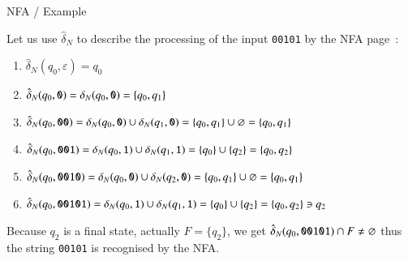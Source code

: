 \documentclass[compress,dvips,xcolor={dvipsnames},t]{beamer}
\begin{document}
%
\begin{frame}[fragile]{NFA / Example}

\label{nfa_01_suffix_formal}

Let us use \(\hat{\delta}_N\) to describe the processing of the input
\verb+00101+ by the NFA page~\pageref{nfa_01_suffix}:
\begin{enumerate}

  \item \(\hat{\delta}_N (q_0, \varepsilon) = q_0\)

  \item \(\hat{\delta}_N (q_0, \verb+0+) = \delta_N (q_0, \verb+0+) =
    \{q_0, q_1\}\)

  \item \(\hat{\delta}_N (q_0, \verb+00+) = \delta_N (q_0, \verb+0+)
    \cup \delta_N (q_1, \verb+0+) = \{q_0, q_1\} \cup \varnothing =
    \{q_0, q_1\}\)

  \item \(\hat{\delta}_N (q_0, \verb+001+) = \delta_N (q_0, \verb+1+)
    \cup \delta_N (q_1, \verb+1+) = \{q_0\} \cup \{q_2\} = \{q_0,
    q_2\}\)

  \item \(\hat{\delta}_N (q_0, \verb+0010+) = \delta_N (q_0, \verb+0+)
    \cup \delta_N (q_2, \verb+0+) = \{q_0, q_1\} \cup \varnothing =
    \{q_0, q_1\}\)

  \item \(\hat{\delta}_N (q_0, \verb+00101+) = \delta_N (q_0,
    \verb+1+) \cup \delta_N (q_1, \verb+1+) = \{q_0\} \cup \{q_2\} =
    \{q_0, q_2\} \ni q_2\)

\end{enumerate}
Because \(q_2\) is a final state, actually \(F = \{q_2\}\), we get
\(\hat{\delta}_N (q_0, \verb+00101+) \cap F \neq \varnothing\) thus
the string \verb+00101+ is recognised by the NFA.

\end{frame}


\end{document}
